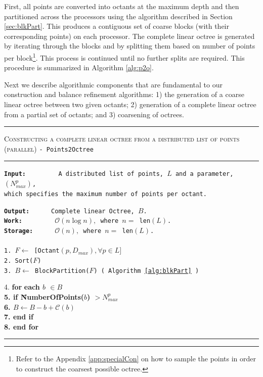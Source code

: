 First, all points are converted into octants at the maximum depth and
then partitioned across the processors using the algorithm described
in Section \ref{sec:blkPart}. This produces a contiguous set of coarse
blocks (with their corresponding points) on each processor. The
complete linear octree is generated by iterating through the blocks
and by splitting them based on number of points per
block\footnote{Refer to the Appendix \ref{app:specialCon} on how to sample
the points in order to construct the coarsest possible octree.}. This
process is continued until no further splits are required. This
procedure is summarized in Algorithm \ref{alg:p2o}.

Next we describe algorithmic components that are fundamental to our
construction and balance refinement algorithms: 1) the generation
of a coarse linear octree between two given octants; 2) generation of
a complete linear octree from a partial set of octants; and 3)
coarsening of octrees.

\begin{table} 
\centering
\rule{\textwidth}{0.01mm}
\begin{algorithm}{ \textsc{Constructing a complete linear octree from a distributed list of points (parallel)} \tt{- Points2Octree}}
\rule{\textwidth}{0.01mm}
\flushleft
\begin{tabbing}
\tt{\bf{Input:~~~~~~~~}} \= \tt{A distributed list of points, $L$ and a parameter, $(N_{max}^p)$,}\\
 \>\tt{which specifies the maximum number of points per octant.}
\end{tabbing}
\tt{\bf{Output:~~~~~}} Complete linear Octree, $B$.\\
\tt{\bf{Work:~~~~~~~~}} $\mathcal{O}(n\log n),$ where $n = $ len$(L)$.\\
\tt{\bf{Storage:~~~~~}} $\mathcal{O}(n),$ where $n = $ len$(L)$.\\
~\\
1. $F \leftarrow $ [Octant$(p, D_{max}), \forall p \in L ]$\\
2. Sort($F$)\\
3. $B \leftarrow$ BlockPartition($F$) ( Algorithm \ref{alg:blkPart} ) \\
\begin{tabbing}
4. {\bf for} \= \bf{each} $b$ $\in  B$\\
5.   \> {\bf if} \= NumberOfPoints($b$) $> N_{max}^p$\\
6.   \>  \> $B \leftarrow B - b + \mathcal{C}(b)$\\
7.   \> {\bf end if}\\
8. {\bf end for}
\end{tabbing}
 \label{alg:p2o}
\end{algorithm}
\rule{\textwidth}{0.01mm}
\end{table}

